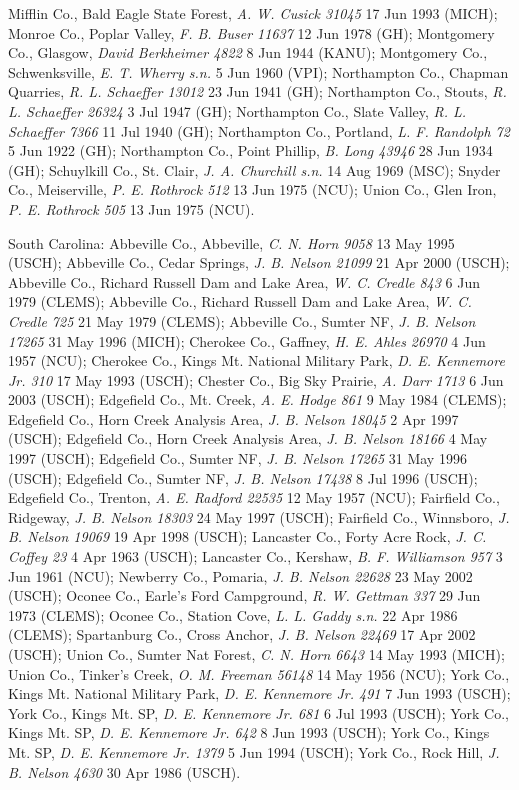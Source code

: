 \documentclass{article}
\begin{document}
Mifflin Co., Bald Eagle State Forest, \textit{A. W. Cusick 31045} 17 Jun 1993 (MICH);
Monroe Co., Poplar Valley, \textit{F. B. Buser 11637} 12 Jun 1978 (GH);
Montgomery Co., Glasgow, \textit{David Berkheimer 4822} 8 Jun 1944 (KANU);
Montgomery Co., Schwenksville, \textit{E. T. Wherry s.n.} 5 Jun 1960 (VPI);
Northampton Co., Chapman Quarries, \textit{R. L. Schaeffer 13012} 23 Jun 1941 (GH);
Northampton Co., Stouts, \textit{R. L. Schaeffer 26324} 3 Jul 1947 (GH);
Northampton Co., Slate Valley, \textit{R. L. Schaeffer 7366} 11 Jul 1940 (GH);
Northampton Co., Portland, \textit{L. F. Randolph 72} 5 Jun 1922 (GH);
Northampton Co., Point Phillip, \textit{B. Long 43946} 28 Jun 1934 (GH);
Schuylkill Co., St. Clair, \textit{J. A. Churchill s.n.} 14 Aug 1969 (MSC);
Snyder Co., Meiserville, \textit{P. E. Rothrock 512} 13 Jun 1975 (NCU);
Union Co., Glen Iron, \textit{P. E. Rothrock 505} 13 Jun 1975 (NCU).

South Carolina:
Abbeville Co., Abbeville, \textit{C. N. Horn 9058} 13 May 1995 (USCH);
Abbeville Co., Cedar Springs, \textit{J. B. Nelson 21099} 21 Apr 2000 (USCH);
Abbeville Co., Richard Russell Dam and Lake Area, \textit{W. C. Credle 843} 6 Jun 1979 (CLEMS);
Abbeville Co., Richard Russell Dam and Lake Area, \textit{W. C. Credle 725} 21 May 1979 (CLEMS);
Abbeville Co., Sumter NF, \textit{J. B. Nelson 17265} 31 May 1996 (MICH);
Cherokee Co., Gaffney, \textit{H. E. Ahles 26970} 4 Jun 1957 (NCU);
Cherokee Co., Kings Mt. National Military Park, \textit{D. E. Kennemore Jr. 310} 17 May 1993 (USCH);
Chester Co., Big Sky Prairie, \textit{A. Darr 1713} 6 Jun 2003 (USCH);
Edgefield Co., Mt. Creek, \textit{A. E. Hodge 861} 9 May 1984 (CLEMS);
Edgefield Co., Horn Creek Analysis Area, \textit{J. B. Nelson 18045} 2 Apr 1997 (USCH);
Edgefield Co., Horn Creek Analysis Area, \textit{J. B. Nelson 18166} 4 May 1997 (USCH);
Edgefield Co., Sumter NF, \textit{J. B. Nelson 17265} 31 May 1996 (USCH);
Edgefield Co., Sumter NF, \textit{J. B. Nelson 17438} 8 Jul 1996 (USCH);
Edgefield Co., Trenton, \textit{A. E. Radford 22535} 12 May 1957 (NCU);
Fairfield Co., Ridgeway, \textit{J. B. Nelson 18303} 24 May 1997 (USCH);
Fairfield Co., Winnsboro, \textit{J. B. Nelson 19069} 19 Apr 1998 (USCH);
Lancaster Co., Forty Acre Rock, \textit{J. C. Coffey 23} 4 Apr 1963 (USCH);
Lancaster Co., Kershaw, \textit{B. F. Williamson 957} 3 Jun 1961 (NCU);
Newberry Co., Pomaria, \textit{J. B. Nelson 22628} 23 May 2002 (USCH);
Oconee Co., Earle's Ford Campground, \textit{R. W. Gettman 337} 29 Jun 1973 (CLEMS);
Oconee Co., Station Cove, \textit{L. L. Gaddy s.n.} 22 Apr 1986 (CLEMS);
Spartanburg Co., Cross Anchor, \textit{J. B. Nelson 22469} 17 Apr 2002 (USCH);
Union Co., Sumter Nat Forest, \textit{C. N. Horn 6643} 14 May 1993 (MICH);
Union Co., Tinker's Creek, \textit{O. M. Freeman 56148} 14 May 1956 (NCU);
York Co., Kings Mt. National Military Park, \textit{D. E. Kennemore Jr. 491} 7 Jun 1993 (USCH);
York Co., Kings Mt. SP, \textit{D. E. Kennemore Jr. 681} 6 Jul 1993 (USCH);
York Co., Kings Mt. SP, \textit{D. E. Kennemore Jr. 642} 8 Jun 1993 (USCH);
York Co., Kings Mt. SP, \textit{D. E. Kennemore Jr. 1379} 5 Jun 1994 (USCH);
York Co., Rock Hill, \textit{J. B. Nelson 4630} 30 Apr 1986 (USCH).
\end{document}
